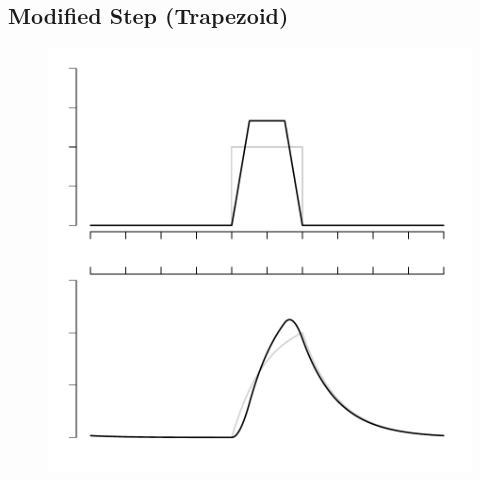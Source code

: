 \documentclass{article}
\begin{document}
\subsection{Modified Step (Trapezoid)}
\begin{figure}
\begin{center}
\includegraphics{template-pstrap}
\end{center}
\end{figure}
\end{document}
